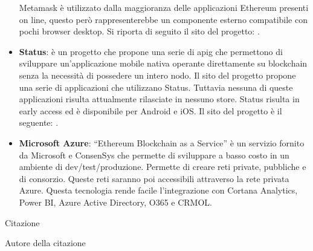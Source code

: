 \begin{itemize}
    Metamask è utilizzato dalla maggioranza delle applicazioni Ethereum presenti on line, questo però rappresenterebbe un componente esterno compatibile con pochi browser desktop. Si riporta di seguito il sito del progetto: \cite{site:metamask} .
    \item \textbf{Status}: è un progetto che propone una serie di \gls{apig} che permettono di sviluppare un’applicazione mobile nativa operante direttamente su blockchain senza la necessità di possedere un intero nodo. Il sito del progetto propone una serie di applicazioni che utilizzano Status. Tuttavia nessuna di queste applicazioni risulta attualmente rilasciate in nessuno store. Status risulta in early access ed è disponibile per Android e iOS. Il sito del progetto è il seguente: \cite{site:status}.
    \item \textbf{Microsoft Azure}: “Ethereum Blockchain as a Service” è un servizio fornito da Microsoft e ConsenSys che permette di sviluppare a basso costo in un ambiente di dev/test/produzione. Permette di creare reti private, pubbliche e di consorzio. Queste reti saranno poi accessibili attraverso la rete privata Azure. Questa tecnologia rende facile l’integrazione con Cortana Analytics, Power BI, Azure Active Directory, O365 e CRMOL.
\end{itemize}

\epigraph{Citazione}{Autore della citazione}



